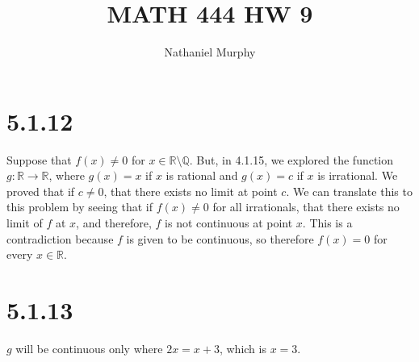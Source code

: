 \documentclass[11pt]{article}
\title{\textbf{MATH 444 HW 9}}
\author{Nathaniel Murphy}
\date{}
\begin{document}
\maketitle

\section*{5.1.12}
Suppose that $f(x)\neq 0$ for $x \in \mathbb{R} \setminus \mathbb{Q}$. But, in 4.1.15, we explored the function $g:\mathbb{R}\rightarrow\mathbb{R}$, where $g(x)=x$ if $x$ is rational and $g(x)=c$ if $x$ is irrational. We proved that if $c\neq 0$, that there exists no limit at point $c$. We can translate this to this problem by seeing that if $f(x)\neq 0$ for all irrationals, that there exists no limit of $f$ at $x$, and therefore, $f$ is not continuous at point $x$. This is a contradiction because $f$ is given to be continuous, so therefore $f(x)=0$ for every $x\in\mathbb{R}$.

\section*{5.1.13}
$g$ will be continuous only where $2x=x+3$, which is $x=3$.
\end{document}
